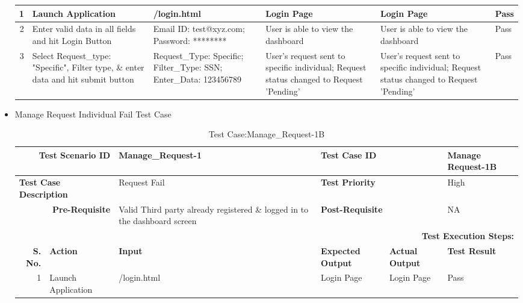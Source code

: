 \documentclass[a4paper, hidelinks, 12pt]{report}
\begin{document}
\begin{itemize}
\begin{table}[H]
\begin{tabular}{|r|p{4.355em}|p{7.715em}|p{6.43em}|p{5.855em}|p{5.07em}|}
    \midrule
    1     & Launch Application & /login.html & Login Page & Login Page & Pass \\
    \midrule
    2     & Enter valid data in all fields and hit Login Button & Email ID: test@xyz.com; Password: ******** & User is able to view the dashboard & User is able to view the dashboard & Pass \\
    \midrule
    3     & Select Request\_type: "Specific", Filter type, \& enter data and hit submit button & Request\_Type: Specific; Filter\_Type: SSN; Enter\_Data: 123456789 & User's request sent to specific individual; Request status changed to Request 'Pending' & User's request sent to specific individual; Request status changed to Request 'Pending' & Pass \\
    \bottomrule
    \end{tabular}%
  \label{tab:Test Case: Manage Request-1A}%
\end{table}%
\item{Manage Request Individual Fail Test Case}
\begin{table}[H]
  \centering
  \caption{Test Case:Manage\_Request-1B}
    \begin{tabular}{|r|p{4.355em}|p{7.715em}|p{6.43em}|p{5.855em}|p{5.07em}|}
    \toprule
    \multicolumn{2}{|p{13.425em}|}{\textbf{Test Scenario ID}} & Manage\_Request-1 & \multicolumn{2}{p{12.285em}|}{\textbf{Test Case ID}} & Manage Request-1B \\
    \midrule
    \multicolumn{2}{|l|}{\multirow{2}[2]{*}{\textbf{Test Case Description}}} & \multirow{2}[2]{*}{Request Fail} & \multicolumn{2}{l|}{\multirow{2}[2]{*}{\textbf{Test Priority}}} & \multirow{2}[2]{*}{High} \\
    \multicolumn{2}{|l|}{} & \multicolumn{1}{l|}{} & \multicolumn{2}{l|}{} & \multicolumn{1}{l|}{} \\
    \midrule
    \multicolumn{2}{|p{13.425em}|}{\textbf{Pre-Requisite}} & Valid Third party already registered \& logged in to the dashboard screen & \multicolumn{2}{p{12.285em}|}{\textbf{Post-Requisite}} & NA \\
    \midrule
    \multicolumn{6}{p{38.495em}|}{\textbf{Test Execution Steps:}} \\
    \midrule
    \multicolumn{1}{|p{5.07em}|}{\textbf{S. No.}} & \textbf{Action } & \textbf{Input} & \textbf{Expected Output} & \textbf{Actual Output} & \textbf{Test Result} \\
    \midrule
    1     & Launch Application & /login.html & Login Page & Login Page & Pass \\

\end{tabular}
\end{table}
\end{itemize}
\end{document}

